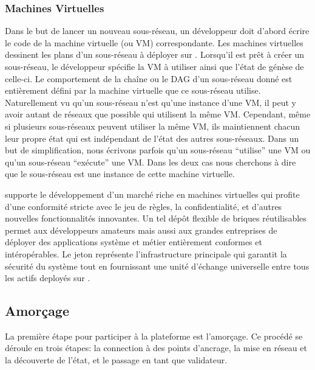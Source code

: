 \documentclass[runningheads]{llncs}
\begin{document}
\subsubsection{Machines Virtuelles}
Dans le but de lancer un nouveau sous-réseau, un développeur doit d'abord écrire le code de la machine virtuelle (ou VM)
correspondante. Les machines virtuelles dessinent les plans d'un sous-réseau à déployer sur \AVAPlatformName{}.
Lorsqu'il est prêt à créer un sous-réseau, le développeur spécifie la VM à utiliser ainsi que l'état de génèse de
celle-ci. Le comportement de la chaîne ou le DAG d'un sous-réseau donné est entièrement défini par la machine virtuelle
que ce sous-réseau utilise. Naturellement vu qu'un sous-réseau n'est qu'une instance d'une VM, il peut y avoir autant de
réseaux que possible qui utilisent la même VM. Cependant, même si plusieurs sous-réseaux peuvent utiliser la même VM,
ils maintiennent chacun leur propre état qui est indépendant de l'état des autres sous-réseaux. Dans un but de
simplification, nous écrivons parfois qu'un sous-réseau ``utilise'' une VM ou qu'un sous-réseau ``exécute'' une VM.
Dans les deux cas nous cherchons à dire que le sous-réseau est une instance de cette machine virtuelle.

\AVAPlatformName{} supporte le développement d'un marché riche en machines virtuelles qui profite d'une conformité
stricte avec le jeu de règles, la confidentialité, et d'autres nouvelles fonctionnalités innovantes. Un tel dépôt
flexible de briques réutilisables permet aux développeurs amateurs mais aussi aux grandes entreprises de déployer des
applications système et métier entièrement conformes et intéropérables. Le jeton \AVATokenName{} représente
l'infrastructure principale qui garantit la sécurité du système tout en fournissant une unité d'échange universelle
entre tous les actifs deployés sur \AVAPlatformName{}.

\subsection{Amorçage}
La première étape pour participer à la plateforme \AVAPlatformName{} est l'amorçage. Ce procédé se déroule en trois
étapes: la connection à des points d'ancrage, la mise en réseau et la découverte de l'état, et le passage en tant
que validateur.
\end{document}
